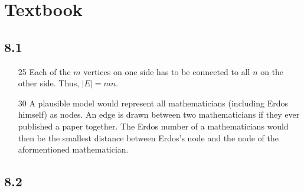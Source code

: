 \documentclass[12pt]{article}
\begin{document}
\section{Textbook}\label{sec:textbook}

\subsection*{8.1}\label{sec:8.1}

\begin{enumerate}
    \item[25] Each of the $m$ vertices on one side has to be connected to all $n$ on the other side.
          Thus, $|E|=\boxed{mn}$.
    \item[30] A plausible model would represent all mathematicians (including Erdos himself) as nodes.
          An edge is drawn between two mathematicians if they ever published a paper together.
          The Erdos number of a mathematicians would then be the smallest distance between
          Erdos's node and the node of the aformentioned mathematician.
\end{enumerate}

\subsection*{8.2}\label{sec:8.2}
\end{document}
